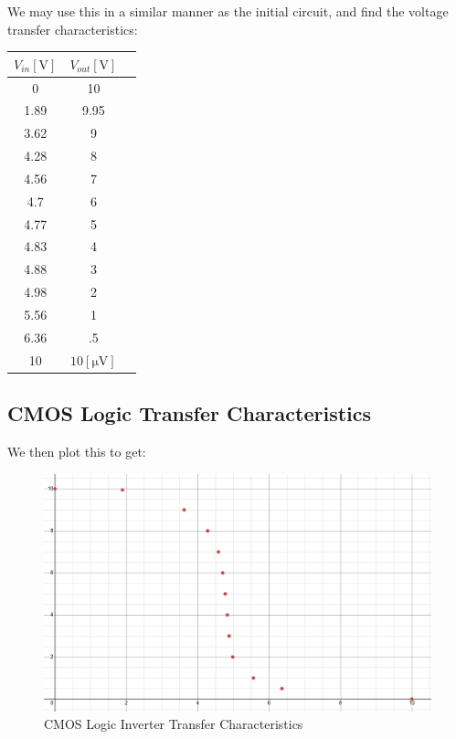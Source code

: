 \documentclass[
	letterpaper, %
	10pt, %
]{CSUniSchoolLabReport}
\begin{document}
We may use this in a similar manner as the initial circuit, and find the voltage transfer characteristics:

\begin{center}
  \begin{tabular}[H]{|c|c|c|}
    \hline
    $V_{in}[\si{\volt}]$ & $V_{out}[\si{\volt}]$\\
    \hline
    0 & 10\\
    \hline
    1.89 & 9.95\\
    \hline
    3.62 & 9\\
    \hline
    4.28 & 8\\
    \hline
    4.56 & 7\\
    \hline
    4.7 & 6\\
    \hline
    4.77 & 5\\
    \hline
    4.83 & 4\\
    \hline
    4.88 & 3\\
    \hline
    4.98 & 2\\
    \hline
    5.56 & 1\\
    \hline
    6.36 & .5\\
    \hline
    10 & $10[\si{\micro\volt}]$\\
    \hline
  \end{tabular}
\end{center}

\subsection{CMOS Logic Transfer Characteristics}

We then plot this to get:

\begin{figure}[H]
  \centering
  \includegraphics[width=.9\textwidth]{Figures/L5F5}
  \caption{CMOS Logic Inverter Transfer Characteristics}
  \label{fig:5}
\end{figure}
\end{document}
